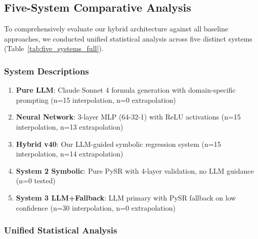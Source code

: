 %


\subsection{Five-System Comparative Analysis}
\label{sec:five_systems}

To comprehensively evaluate our hybrid architecture against all baseline approaches, we conducted unified statistical analysis across five distinct systems (Table~\ref{tab:five_systems_full}).

\subsubsection{System Descriptions}

\begin{enumerate}
    \item \textbf{Pure LLM}: Claude Sonnet 4 formula generation with domain-specific prompting (n=15 interpolation, n=0 extrapolation)
    \item \textbf{Neural Network}: 3-layer MLP (64-32-1) with ReLU activations (n=15 interpolation, n=13 extrapolation)
    \item \textbf{Hybrid v40}: Our LLM-guided symbolic regression system (n=15 interpolation, n=14 extrapolation)
    \item \textbf{System 2 Symbolic}: Pure PySR with 4-layer validation, no LLM guidance (n=0 tested)
    \item \textbf{System 3 LLM+Fallback}: LLM primary with PySR fallback on low confidence (n=30 interpolation, n=0 extrapolation)
\end{enumerate}

\subsubsection{Unified Statistical Analysis}

